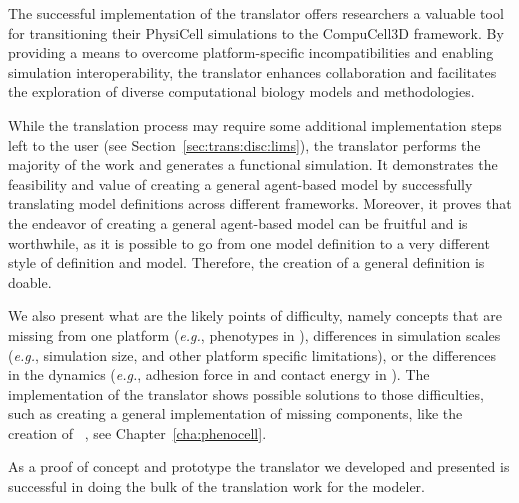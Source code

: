 The successful implementation of the translator offers researchers a valuable tool for transitioning their PhysiCell simulations to the CompuCell3D framework. By providing a means to overcome platform-specific incompatibilities and enabling simulation interoperability, the translator enhances collaboration and facilitates the exploration of diverse computational biology models and methodologies.

While the translation process may require some additional implementation steps left to the user (see Section~\ref{sec:trans:disc:lims}), the translator performs the majority of the work and generates a functional simulation. It demonstrates the feasibility and value of creating a general agent-based model by successfully translating model definitions across different frameworks.  Moreover, it proves that the endeavor of creating a general agent-based model can be fruitful and is worthwhile, as it is possible to go from one model definition to a very different style of definition and model. Therefore, the creation of a general definition is doable.

We also present what are the likely points of difficulty, namely concepts that are missing from one platform (\textit{e.g.}, phenotypes in \ccd), differences in simulation scales (\textit{e.g.}, simulation size, and other platform specific limitations), 
or the differences in the dynamics (\textit{e.g.}, adhesion force in \pscs and contact energy in \ccd). The implementation of the translator shows possible solutions to those difficulties, such as creating a general implementation of missing components, like the creation of \pcp~\cite{gianlupi_phenocellpy_2023}, see Chapter~\ref{cha:phenocell}.

As a proof of concept and prototype the translator we developed and presented is successful in doing the bulk of the translation work for the modeler. 



